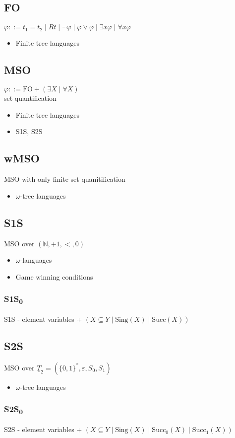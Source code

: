 \documentclass{article}
\begin{document}
\subsection{FO}
$\varphi ::= t_1 = t_2 \mid R\overline{t} \mid \neg \varphi \mid \varphi \lor \varphi \mid \exists x \varphi \mid \forall x \varphi$

\begin{itemize}
	\item Finite tree languages
\end{itemize}

\subsection{MSO}
$\varphi ::= \text{FO} + (\exists X \mid \forall X)$ \\
set quantification

\begin{itemize}
	\item Finite tree languages
	\item S1S, S2S
\end{itemize}

\subsection{wMSO}
MSO with only finite set quanitification

\begin{itemize}
	\item $\omega$-tree languages
\end{itemize}

\subsection{S1S}
MSO over $(\mathbb{N}, +1, <, 0)$

\begin{itemize}
	\item $\omega$-languages
	\item Game winning conditions
\end{itemize}

\subsubsection*{S1S\textsubscript{0}}
S1S - element variables + $(X \subseteq Y \mid \text{Sing}(X) \mid \text{Succ}(X))$

\subsection{S2S}
MSO over $\underline{T}_2 = (\{0, 1\}^*, \varepsilon, S_0, S_1)$

\begin{itemize}
	\item $\omega$-tree languages
\end{itemize}

\subsubsection*{S2S\textsubscript{0}}
S2S - element variables + $(X \subseteq Y \mid \text{Sing}(X) \mid \text{Succ}_0(X) \mid \text{Succ}_1(X))$
\end{document}

